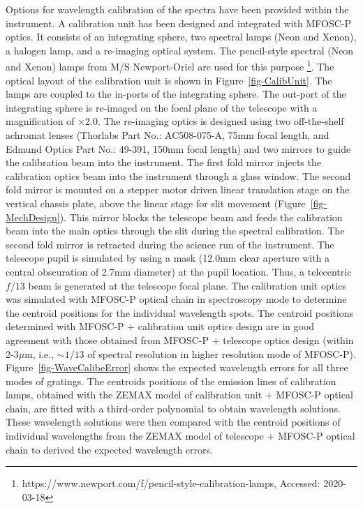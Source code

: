 Options for wavelength calibration of the spectra have been provided within the instrument. A calibration unit has been designed and integrated with MFOSC-P optics. It consists of an integrating sphere, two spectral lamps (Neon and Xenon), a halogen lamp, and a re-imaging optical system. The pencil-style spectral (Neon and Xenon) lamps from M/S Newport-Oriel are used for this purpose \footnote{https://www.newport.com/f/pencil-style-calibration-lamps, Accessed: 2020-03-18}. The optical layout of the calibration unit is shown in Figure~\ref{fig-CalibUnit}. The lamps are coupled to the in-ports of the integrating sphere. The out-port of the integrating sphere is re-imaged on the focal plane of the telescope with a magnification of $\times$2.0. The re-imaging optics is designed using two off-the-shelf achromat lenses (Thorlabs Part No.: AC508-075-A, 75mm focal length, and Edmund Optics Part No.: 49-391, 150mm focal length) and two mirrors to guide the calibration beam into the instrument. The first fold mirror injects the calibration optics beam into the instrument through a glass window. The second fold mirror is mounted on a stepper motor driven linear translation stage on the vertical chassis plate, above the linear stage for slit movement (Figure~\ref{fig-MechDesign}). This mirror blocks the telescope beam and feeds the calibration beam into the main optics through the slit during the spectral calibration. The second fold mirror is retracted during the science run of the instrument. The telescope pupil is simulated by using a mask (12.0mm clear aperture with a central obscuration of 2.7mm diameter) at the pupil location. Thus, a telecentric $f/13$ beam is generated at the telescope focal plane. The calibration unit optics was simulated with MFOSC-P optical chain in spectroscopy mode to determine the centroid positions for the individual wavelength spots. The centroid positions determined with MFOSC-P $+$ calibration unit optics design are in good agreement with those obtained from MFOSC-P $+$ telescope optics design (within 2-3$\mu$m, i.e., $\sim1/13$ of spectral resolution in higher resolution mode of MFOSC-P). Figure~\ref{fig-WaveCalibeError} shows the expected wavelength errors for all three modes of gratings. The centroids positions of the emission lines of calibration lamps, obtained with the ZEMAX model of calibration unit $+$ MFOSC-P optical chain, are fitted with a third-order polynomial to obtain wavelength solutions. These wavelength solutions were then compared with the centroid positions of individual wavelengths from the ZEMAX model of telescope $+$ MFOSC-P optical chain to derived the expected wavelength errors.


